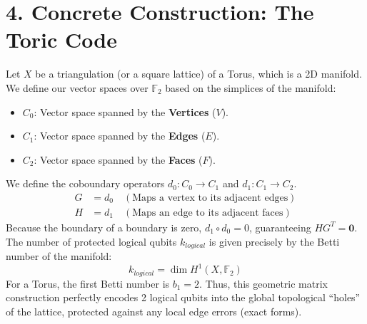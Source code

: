 \documentclass[11pt, a4paper, twoside]{article}
\newcommand{\F}{\mathbb{F}}
\begin{document}
	\section*{4. Concrete Construction: The Toric Code}
	
	\begin{examplebox}
		Let $X$ be a triangulation (or a square lattice) of a Torus, which is a 2D manifold. We define our vector spaces over $\F_2$ based on the simplices of the manifold:
		\begin{itemize}
			\item $C_0$: Vector space spanned by the \textbf{Vertices} ($V$).
			\item $C_1$: Vector space spanned by the \textbf{Edges} ($E$).
			\item $C_2$: Vector space spanned by the \textbf{Faces} ($F$).
		\end{itemize}
		We define the coboundary operators $d_0: C_0 \to C_1$ and $d_1: C_1 \to C_2$.
		\begin{align*}
			G &= d_0 \quad (\text{Maps a vertex to its adjacent edges}) \\
			H &= d_1 \quad (\text{Maps an edge to its adjacent faces})
		\end{align*}
		Because the boundary of a boundary is zero, $d_1 \circ d_0 = 0$, guaranteeing $HG^T = \mathbf{0}$. The number of protected logical qubits $k_{logical}$ is given precisely by the Betti number of the manifold:
		$$ k_{logical} = \dim H^1(X, \F_2) $$
		For a Torus, the first Betti number is $b_1 = 2$. Thus, this geometric matrix construction perfectly encodes 2 logical qubits into the global topological ``holes'' of the lattice, protected against any local edge errors (exact forms).
	\end{examplebox}
	
\end{document}
